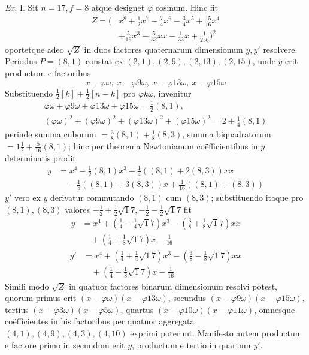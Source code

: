 \textit{Ex.} I. Sit \(n=17,\allowbreak f=8\) atque designet \(\varphi\) cosinum. Hinc fit \[\begin{aligned}Z=\bigl(&x^8+\tfrac12x^7-\tfrac74x^6-\tfrac34x^5+\tfrac{15}{16}x^4\\&+\tfrac5{16}x^3-\tfrac5{32}xx-\tfrac1{32}x+\tfrac1{256}\bigr)^2\end{aligned}\] oportetque adeo \(\surd Z\) in duos factores quaternarum dimensionum \(y,\allowbreak y'\) resolvere. Periodus \(P=(8,1)\) constat ex \((2,1),\allowbreak (2,9),\allowbreak (2,13),\allowbreak (2,15)\), unde \(y\) erit productum e factoribus \[x-\varphi\omega,\ x-\varphi9\omega,\ x-\varphi13\omega,\ x-\varphi15\omega\] Substituendo \(\tfrac12[k]+\tfrac12[n-k]\) pro \(\varphi k\omega\), invenitur \[\begin{gathered}\varphi\omega+\varphi9\omega+\varphi13\omega+\varphi15\omega=\tfrac12(8,1),\\(\varphi\omega)^2+(\varphi9\omega)^2+(\varphi13\omega)^2+(\varphi15\omega)^2=2+\tfrac14(8,1)\end{gathered}\] perinde summa cuborum \(=\tfrac38(8,1)+\tfrac18(8,3)\), summa biquadratorum \(=1\tfrac12+\tfrac5{16}(8,1)\); hinc per theorema Newtonianum coëfficientibus in \(y\) determinatis prodit \[\begin{aligned}y&=x^4-\tfrac12(8,1)x^3+\tfrac14((8,1)+2(8,3))xx\\&\quad-\tfrac18((8,1)+3(8,3))x+\tfrac1{16}((8,1)+(8,3))\end{aligned}\] \(y'\) vero ex \(y\) derivatur commutando \((8,1)\) cum \((8,3)\); substituendo itaque pro \((8,1),\allowbreak (8,3)\) valores \(-\tfrac12+\tfrac12\surd17,\allowbreak -\tfrac12-\tfrac12\surd17\) fit \[\begin{aligned}y&=x^4+(\tfrac14-\tfrac14\surd17)x^3-(\tfrac38+\tfrac18\surd17)xx\\&\quad+(\tfrac14+\tfrac18\surd17)x-\tfrac1{16}\end{aligned}\] \[\begin{aligned}y'&=x^4+(\tfrac14+\tfrac14\surd17)x^3-(\tfrac38-\tfrac18\surd17)xx\\&\quad+(\tfrac14-\tfrac18\surd17)x-\tfrac1{16}\end{aligned}\] Simili modo \(\surd Z\) in quatuor factores binarum dimensionum resolvi potest, quorum primus erit \((x-\varphi\omega)(x-\varphi13\omega)\), secundus \((x-\varphi9\omega)(x-\varphi15\omega)\), tertius \((x-\varphi3\omega)(x-\varphi5\omega)\), quartus \((x-\varphi10\omega)(x-\varphi11\omega)\), omnesque coëfficientes in his factoribus per quatuor aggregata \((4,1),\allowbreak (4,9),\allowbreak (4,3),\allowbreak (4,10)\) exprimi poterunt. Manifesto autem productum e factore primo in secundum erit \(y\), productum e tertio in quartum \(y'\).

